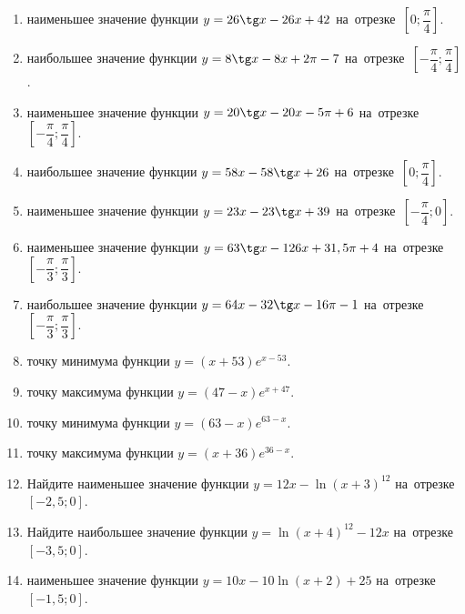 \documentclass[a4paper,10pt]{article}
\begin{document}
\begin{enumerate}
\item {} наименьшее значение функции $y = 26\tg x-26x+42$ на~отрезке~$\left[0;\dfrac{\pi }{4}\right]$.

\item {} наибольшее значение функции $y=8\tg x-8x+2\pi -7$ на~отрезке~$\left[-\dfrac{\pi }{4};\dfrac{\pi }{4}\right]$.

\item {} наименьшее значение функции $y=20\tg x-20x-5\pi +6$ на~отрезке~$\left[-\dfrac{\pi }{4};\dfrac{\pi }{4}\right]$.

\item {} наибольшее значение функции $y = 58x-58\tg x +26$ на~отрезке~$\left[0;\dfrac{\pi }{4}\right]$.

\item {} наименьшее значение функции $y = 23x-23\tg x +39$ на~отрезке~$\left[-\dfrac{\pi }{4};0\right]$.

\item {} наименьшее значение функции $y = 63\tg x-126x+31,5 \pi +4$ на~отрезке~$\left[-\dfrac{\pi }{3};\dfrac{\pi }{3}\right]$.

\item {} наибольшее значение функции $y = 64x-32\tg x-16\pi -1$ на~отрезке~$\left[-\dfrac{\pi }{3};\dfrac{\pi }{3}\right]$.

\item {} точку минимума функции $y = \left(x+53\right)e^{x-53}$.

\item {} точку максимума функции $y = \left(47-x\right)e^{x+47}$.

\item {} точку минимума функции $y = \left(63-x\right)e^{63-x}$.

\item {} точку максимума функции $y = \left(x+36\right)e^{36-x}$.

\item Найдите наименьшее значение функции $y = 12x-\ln \left(x+3\right)^{12}$ на~отрезке~$\left[-2,5;0\right]$.

\item Найдите наибольшее значение функции $y = \ln \left(x+4\right)^{12}-12x$ на~отрезке~$\left[-3,5;0\right]$.

\item {} наименьшее значение функции $y = 10x-10\ln \left(x+2\right) +25$ на~отрезке~$\left[-1,5;0\right]$.


\end{enumerate}
\end{document}
